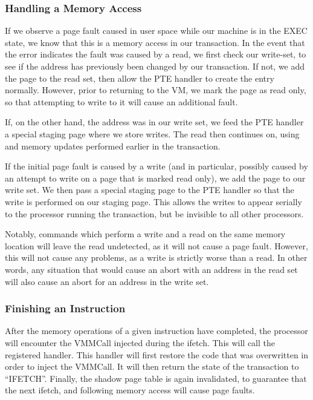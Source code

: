 \documentclass{acm_proc_article-sp}
\begin{document}
\subsubsection{Handling a Memory Access}

If we observe a page fault caused in user space while our machine is in the
EXEC state, we know that this is a memory access in our transaction. In the 
event that the error indicates the fault was caused by a read, we first check
our write-set, to see if the address has previously been changed by our 
transaction. If not, we add the page to the read set, then allow the PTE
handler to create the entry normally. However, prior to returning to the VM,
we mark the page as read only, so that attempting to write to it will cause
an additional fault.

If, on the other hand, the address was in our write set, we feed the PTE
handler a special staging page where we store writes. The read then continues
on, using and memory updates performed earlier in the transaction.

If the initial page fault is caused by a write (and in particular, possibly 
caused by an attempt to write on a page that is marked read only), we 
add the page to our write set. We then pass a special staging page to the PTE
handler so that the write is performed on our staging page. This allows the 
writes to appear serially to the processor running the transaction, but be
invisible to all other processors.

Notably, commands which perform a write and a read on the same memory location
will leave the read undetected, as it will not cause a page fault. However,
this will not cause any problems, as a write is strictly worse than a read. In
other words, any situation that would cause an abort with an address in the 
read set will also cause an abort for an address in the write set.

\subsubsection{Finishing an Instruction}

After the memory operations of a given instruction have completed, the 
processor will encounter the VMMCall injected during the ifetch. This will
call the registered handler. This handler will first restore the code that
was overwritten in order to inject the VMMCall. It will then return the state
of the transaction to ``IFETCH''. Finally, the shadow page table is again 
invalidated, to guarantee that the next ifetch, and following memory access 
will cause page faults.  
\end{document}

